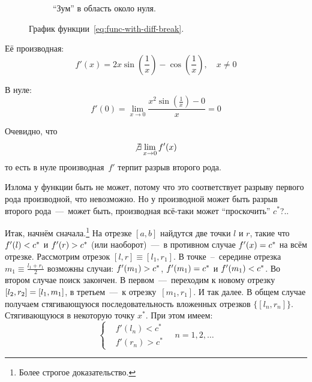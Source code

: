 \documentclass[a4paper,12pt]{article}
\begin{document}
\begin{example}
\begin{figure}[ht]
\begin{subfigure}[b]{0.8\textwidth}
        \caption{``Зум'' в область около нуля.}
      \end{subfigure}
    
      \caption{График функции~\eqref{eq:func-with-diff-break}.}
      \label{fig:func-with-diff-break}
    \end{figure}


    Её производная:
    \[
      f'(x) = 2x \sin{\left(\frac{1}{x}\right)} - \cos{\left(\frac{1}{x}\right)},\quad x \not= 0
    \]

    В нуле:
    \[
      f'(0) = \lim_{x \to 0} \frac{x^2 \sin{\left(\frac{1}{x}\right)} - 0}{x} = 0
    \]

    Очевидно, что
    \[
      \not\exists \lim_{x \to 0} f'(x)
    \]
    то есть в нуле производная~$f'$ терпит разрыв второго рода.
  \end{example}

  Излома у функции быть не может, потому что это соответствует разрыву первого рода производной, что невозможно.
  Но у производной может быть разрыв второго рода~---~может быть, производная всё-таки может ``проскочить'' $c^*$?..
  
  Итак, начнём сначала.\footnote{
    Более строгое доказательство.
  }
  На отрезке $[a, b]$ найдутся две точки $l$ и $r$, такие что $f'(l) \hm< c^*$ и $f'(r) \hm> c^*$ (или наоборот)~---~в противном случае $f'(x) \hm= c^*$ на всём отрезке.
  Рассмотрим отрезок $[l, r] \equiv [l_1, r_1]$.
  В точке~--~середине отрезка $m_1 \equiv \frac{l_1 + r_1}{2}$ возможны случаи: $f'(m_1) \hm> c^*$, $f'(m_1) \hm= c^*$ и $f'(m_1) \hm< c^*$.
  Во втором случае поиск закончен.
  В первом~---~переходим к новому отрезку $[l_2, r_2] \hm= [l_1, m_1]$, в третьем~---~к отрезку~$[m_1, r_1]$.
  И так далее.
  В общем случае получаем стягивающуюся последовательность вложенных отрезков $\bigl\{[l_n, r_n]\bigr\}$.
  Стягивающуюся в некоторую точку $x^*$.
  При этом имеем:
  \[
    \left\{
      \begin{aligned}
        &f'(l_n) < c^*\\
        &f'(r_n) > c^*
      \end{aligned}
    \right.\quad n = 1, 2, \ldots
  \]
\end{document}
